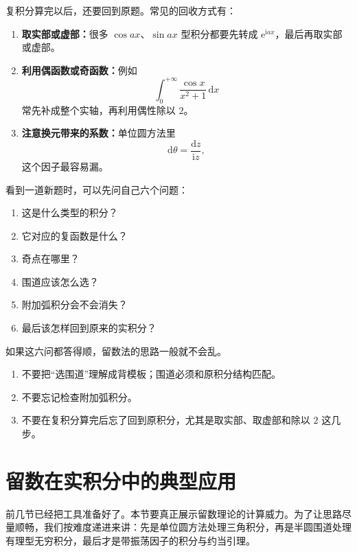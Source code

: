 复积分算完以后，还要回到原题。常见的回收方式有：

\begin{enumerate}
    \item \textbf{取实部或虚部：}很多 $\cos ax$、$\sin ax$ 型积分都要先转成 $\mathrm{e}^{\mathrm{i}ax}$，最后再取实部或虚部。
    \item \textbf{利用偶函数或奇函数：}例如
    \[
        \int_0^{+\infty}\frac{\cos x}{x^2+1}\,\mathrm{d}x
    \]
    常先补成整个实轴，再利用偶性除以 $2$。
    \item \textbf{注意换元带来的系数：}单位圆方法里
    \[
        \mathrm{d}\theta=\frac{\mathrm{d}z}{\mathrm{i}z},
    \]
    这个因子最容易漏。
\end{enumerate}

\begin{tishi}[把做题流程说成人话]
看到一道新题时，可以先问自己六个问题：
\begin{enumerate}
    \item 这是什么类型的积分？
    \item 它对应的复函数是什么？
    \item 奇点在哪里？
    \item 围道应该怎么选？
    \item 附加弧积分会不会消失？
    \item 最后该怎样回到原来的实积分？
\end{enumerate}
如果这六问都答得顺，留数法的思路一般就不会乱。
\end{tishi}

\begin{jinshi}[这一节最值得防的错误]
\begin{enumerate}
    \item 不要把``选围道''理解成背模板；围道必须和原积分结构匹配。
    \item 不要忘记检查附加弧积分。
    \item 不要在复积分算完后忘了回到原积分，尤其是取实部、取虚部和除以 $2$ 这几步。
\end{enumerate}
\end{jinshi}

\section{留数在实积分中的典型应用}

\begin{wulibj}[本节的任务]
前几节已经把工具准备好了。本节要真正展示留数理论的计算威力。为了让思路尽量顺畅，我们按难度递进来讲：先是单位圆方法处理三角积分，再是半圆围道处理有理型无穷积分，最后才是带振荡因子的积分与约当引理。
\end{wulibj}

